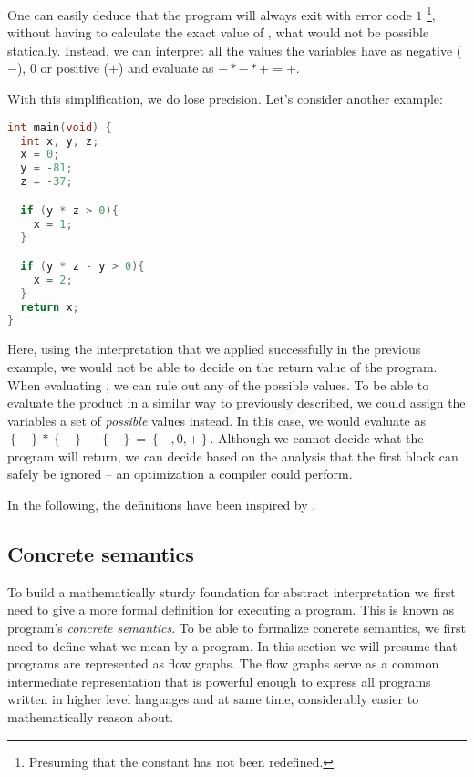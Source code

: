 \documentclass[..thesis.tex]{subfiles}
\begin{document}
One can easily deduce that the program will always exit with error code $1$ \footnote{Presuming that the constant  has not been redefined.},
without having to calculate the exact value of  , what would not be possible statically.
Instead, we can interpret all the values the variables have as negative ($-$), $0$ or positive ($+$) and evaluate   as $-*-*+ = +$.

With this simplification, we do lose precision. Let's consider another example:

\begin{lstlisting}[language=C,style=def]
int main(void) {
  int x, y, z;
  x = 0;
  y = -81;
  z = -37;

  if (y * z > 0){
    x = 1;
  }

  if (y * z - y > 0){
    x = 2;
  }
  return x;
}
\end{lstlisting}

Here, using the interpretation that we applied successfully in the previous example, we would not be able to decide on the return value of the program. 
When evaluating , we can rule out any of the possible values. To be able to evaluate the product in a similar way to previously described,
we could assign the variables a set of \textit{possible} values instead. In this case, we would evaluate  as $\left\lbrace - \right\rbrace * \left\lbrace
- \right\rbrace - \left\lbrace - \right\rbrace = \left\lbrace -,0,+ \right\rbrace$. Although we cannot decide what the program will return,
we can decide based on the analysis that the first  block can safely be ignored -- an optimization a compiler could perform.

In the following, the definitions have been inspired by \cite{vojdanivesal_static_2010, apinis_frameworks_2014}.

\subsection{Concrete semantics}

To build a mathematically sturdy foundation for abstract interpretation we first need to give a more formal definition for executing a program.
This is known as program's \emph{concrete semantics}.
To be able to formalize concrete semantics, we first need to define what we mean by a program. In this section we will presume that programs are represented as flow graphs.
The flow graphs serve as a common intermediate representation that is powerful enough to express all programs written in higher level languages and at same time,
considerably easier to mathematically reason about.
\end{document}
